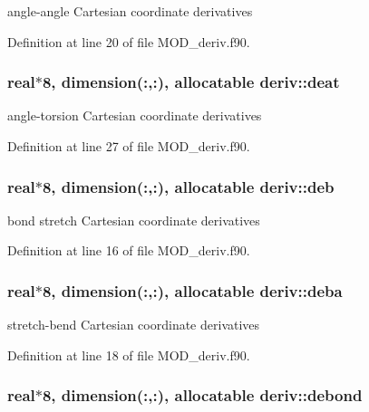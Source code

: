 angle-\/angle Cartesian coordinate derivatives 



Definition at line 20 of file M\-O\-D\-\_\-deriv.\-f90.

\hypertarget{classderiv_a45a3db97ce3e3b1c26c10d4231cb7081}{
\subsubsection[{deat}]{\setlength{\rightskip}{0pt plus 5cm}real$\ast$8, dimension(\-:,\-:), allocatable deriv\-::deat}}\label{classderiv_a45a3db97ce3e3b1c26c10d4231cb7081}


angle-\/torsion Cartesian coordinate derivatives 



Definition at line 27 of file M\-O\-D\-\_\-deriv.\-f90.

\hypertarget{classderiv_adf3de30efcc38f11639ab87980898c1d}{
\subsubsection[{deb}]{\setlength{\rightskip}{0pt plus 5cm}real$\ast$8, dimension(\-:,\-:), allocatable deriv\-::deb}}\label{classderiv_adf3de30efcc38f11639ab87980898c1d}


bond stretch Cartesian coordinate derivatives 



Definition at line 16 of file M\-O\-D\-\_\-deriv.\-f90.

\hypertarget{classderiv_a479a8850d2549252355482a1a3b50894}{
\subsubsection[{deba}]{\setlength{\rightskip}{0pt plus 5cm}real$\ast$8, dimension(\-:,\-:), allocatable deriv\-::deba}}\label{classderiv_a479a8850d2549252355482a1a3b50894}


stretch-\/bend Cartesian coordinate derivatives 



Definition at line 18 of file M\-O\-D\-\_\-deriv.\-f90.

\hypertarget{classderiv_aebc93b62282db8e737081b270eeb18ca}{
\subsubsection[{debond}]{\setlength{\rightskip}{0pt plus 5cm}real$\ast$8, dimension(\-:,\-:), allocatable deriv\-::debond}}\label{classderiv_aebc93b62282db8e737081b270eeb18ca}



